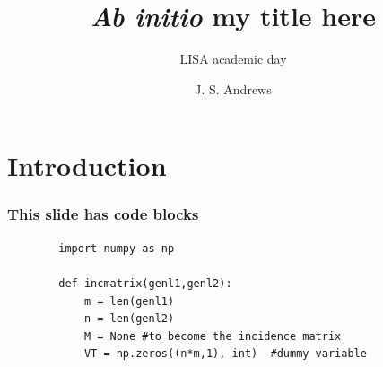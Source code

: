 \documentclass[aspectratio=169]{beamer}
\title[]{\bfseries \color{white} \textit{Ab initio} my title here}
\subtitle{\color{white} LISA academic day}
\author[Author]{\color{white} J. S. Andrews}
\begin{document}
{
\begin{frame}[plain]
  \titlepage
\end{frame}
}


    



    

    \section{Introduction}


    \begin{frame}[fragile]
        \frametitle{This slide has code blocks}
		\begin{verbatim}
        import numpy as np
         
        def incmatrix(genl1,genl2):
            m = len(genl1)
            n = len(genl2)
            M = None #to become the incidence matrix
            VT = np.zeros((n*m,1), int)  #dummy variable
        \end{verbatim}
    \end{frame}
\end{document}
